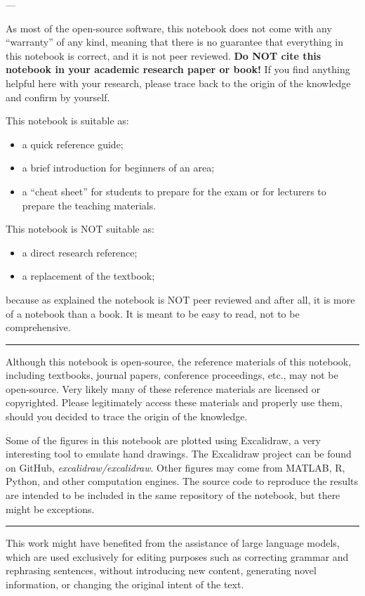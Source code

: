 \noindent ---

\noindent As most of the open-source software, this notebook does not come with any ``warranty'' of any kind, meaning that there is no guarantee that everything in this notebook is correct, and it is not peer reviewed. \textbf{Do NOT cite this notebook in your academic research paper or book!} If you find anything helpful here with your research, please trace back to the origin of the knowledge and confirm by yourself.

This notebook is suitable as:
\begin{itemize}
  \item a quick reference guide;
  \item a brief introduction for beginners of an area;
  \item a ``cheat sheet'' for students to prepare for the exam or for lecturers to prepare the teaching materials.
\end{itemize}

This notebook is NOT suitable as:
\begin{itemize}
  \item a direct research reference;
  \item a replacement of the textbook;
\end{itemize}
because as explained the notebook is NOT peer reviewed and after all, it is more of a notebook than a book. It is meant to be easy to read, not to be comprehensive.

\vspace{0.1in}
\noindent \rule{1in}{0.4pt}
\vspace{0.1in}

Although this notebook is open-source, the reference materials of this notebook, including textbooks, journal papers, conference proceedings, etc., may not be open-source. Very likely many of these reference materials are licensed or copyrighted. Please legitimately access these materials and properly use them, should you decided to trace the origin of the knowledge.

Some of the figures in this notebook are plotted using Excalidraw, a very interesting tool to emulate hand drawings. The Excalidraw project can be found on GitHub, \textit{excalidraw/excalidraw}. Other figures may come from MATLAB, R, Python, and other computation engines. The source code to reproduce the results are intended to be included in the same repository of the notebook, but there might be exceptions.

\vspace{0.1in}
\noindent \rule{1in}{0.4pt}
\vspace{0.1in}

This work might have benefited from the assistance of large language models, which are used exclusively for editing purposes such as correcting grammar and rephrasing sentences, without introducing new content, generating novel information, or changing the original intent of the text.

